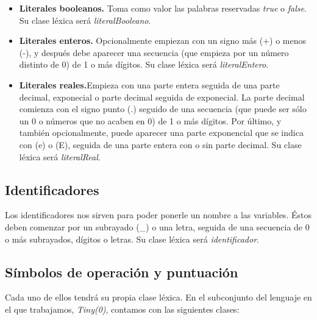 \begin{itemize}
    \item \textbf{Literales booleanos.} Toma como valor las palabras reservadas \textit{true} o \textit{false}. Su clase léxica será
        \textit{literalBooleano}.
    \item \textbf{Literales enteros.} Opcionalmente empiezan con un signo más (+) o menos (-), y después debe aparecer una
        secuencia (que empieza por un número distinto de 0) de 1 o más dígitos. Su clase léxica será \textit{literalEntero}.
    \item \textbf{Literales reales.}Empieza con una parte entera seguida de una parte decimal, exponecial o parte decimal seguida de exponecial. La parte decimal comienza con el signo punto (.) seguido de una secuencia (que puede ser sólo un 0 o números que no acaben en 0) de 1 o más dígitos. Por último, y también opcionalmente, puede aparecer una parte exponencial que se indica con (e) o (E), seguida de una parte entera con o sin parte decimal. Su clase léxica será \textit{literalReal}.
\end{itemize}

\subsection{Identificadores}

Los identificadores nos sirven para poder ponerle un nombre a las variables. Éstos deben comenzar por un subrayado (\_) o una letra, seguida de una secuencia de 0 o más
subrayados, dígitos o letras. Su clase léxica será \textit{identificador}.

\subsection{Símbolos de operación y puntuación}

Cada uno de ellos tendrá su propia clase léxica. En el subconjunto del lenguaje en el que trabajamos, \textit{Tiny(0)}, contamos con
las siguientes clases:

